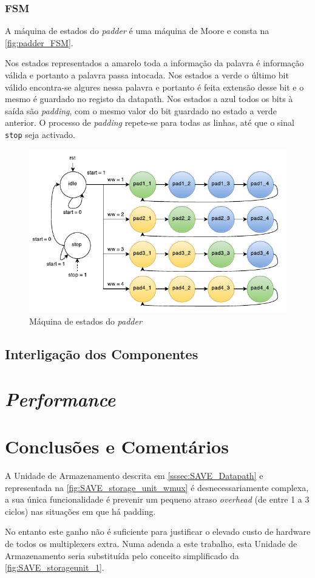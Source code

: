 \documentclass[a4paper]{article}
\begin{document}
\subsubsection{FSM}
A máquina de estados do \textit{padder} é uma máquina de Moore e consta na \autoref{fig:padder_FSM}.

Nos estados representados a amarelo toda a informação da palavra é informação válida e portanto a palavra passa intocada. Nos estados a verde o último bit válido encontra-se algures nessa palavra e portanto é feita extensão desse bit e o mesmo é guardado no registo da datapath. Nos estados a azul todos os bits à saída são \textit{padding}, com o mesmo valor do bit guardado no estado a verde anterior. O processo de \textit{padding} repete-se para todas as linhas, até que o sinal \texttt{stop} seja activado.

\begin{figure}[h]
	\centering
	\includegraphics[width=.9\linewidth]{padder_FSM}
	\caption{Máquina de estados do \textit{padder}}
	\label{fig:padder_FSM}
\end{figure}

\subsection{Interligação dos Componentes}	%

\section{\textit{Performance}}	%

\section{Conclusões e Comentários}

A Unidade de Armazenamento descrita em \ref{sssec:SAVE_Datapath} e representada na \autoref{fig:SAVE_storage_unit_wmux} é desnecessariamente complexa, a sua única funcionalidade é prevenir um pequeno atraso \textit{overhead} (de entre 1 a 3 ciclos) nas situações em que há padding.

No entanto este ganho não é suficiente para justificar o elevado custo de hardware de todos os multiplexers extra. Numa adenda a este trabalho, esta Unidade de Armazenamento seria substituída pelo conceito simplificado da \autoref{fig:SAVE_storageunit_1}.
\end{document}
